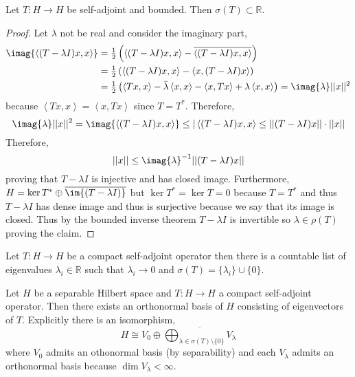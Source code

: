 \documentclass[12pt]{article}
\newcommand{\inner}[2]{\left< #1, #2 \right>}
\newcommand{\R}{\mathbb{R}}
\begin{document}
\begin{prop}
Let $T : H \to H$ be self-adjoint and bounded. Then $\sigma(T) \subset \R$.
\end{prop}

\begin{proof}
Let $\lambda$ not be real and consider the imaginary part,
\begin{align*}
\imag{\inner{(T - \lambda I)x}{x}} & = \tfrac{1}{2} \left( \inner{(T - \lambda I)x}{x} - \overline{\inner{(T - \lambda I)x}{x}} \right)
\\
& = \tfrac{1}{2} \left( \inner{(T - \lambda I)x}{x} - \inner{x}{(T - \lambda I) x} \right)
\\
& = \tfrac{1}{2} \left( \inner{T x}{x} - \bar{\lambda} \inner{x}{x} - \inner{x}{T x} + \lambda \inner{x}{x} \right) = \imag{\lambda} || x ||^2 
\end{align*}
because $\inner{T x}{x} = \inner{x}{Tx}$ since $T = T^*$. Therefore,
\[ \imag{\lambda} || x ||^2 = \imag{\inner{(T - \lambda I)x}{x}} \le | \inner{(T - \lambda I)x}{x} \le || (T - \lambda I) x || \cdot || x || \]
Therefore,
\[ || x || \le \imag{\lambda}^{-1} || (T - \lambda I) x || \]
proving that $T - \lambda I$ is injective and has closed image. Furthermore, $H = \ker{T^*} \oplus \overline{\im{(T - \lambda I)}}$ but $\ker{T^*} = \ker{T} = 0$ because $T = T^*$ and thus $T - \lambda I$ has dense image and thus is surjective because we say that its image is closed. Thus by the bounded inverse theorem $T - \lambda I$ is invertible so $\lambda \in \rho(T)$ proving the claim.
\end{proof}

\begin{cor}
Let $T : H \to H$ be a compact self-adjoint operator then there is a countable list of eigenvalues $\lambda_i \in \R$ such that $\lambda_i \to 0$ and $\sigma(T) = \{ \lambda_i \} \cup \{ 0 \}$. 
\end{cor}

\begin{thm}
Let $H$ be a separable Hilbert space and $T : H \to H$ a compact self-adjoint operator. Then there exists an orthonormal basis of $H$ consisting of eigenvectors of $T$. Explicitly there is an isomorphism,
\[ H \cong V_0 \oplus \overline{\bigoplus_{\lambda \in \sigma(T) \setminus \{ 0 \}} V_\lambda} \]
where $V_0$ admits an othonormal basis (by separability) and each $V_\lambda$ admits an orthonormal basis because $\dim{V_\lambda} < \infty$.
\end{thm}
\end{document}
